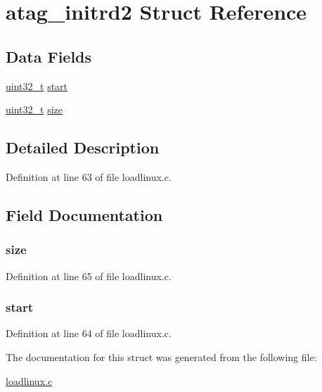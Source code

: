 \hypertarget{structatag__initrd2}{\section{atag\-\_\-initrd2 \-Struct \-Reference}
\label{structatag__initrd2}
}
\subsection*{\-Data \-Fields}
\begin{DoxyCompactItemize}
\item 
\hyperlink{arch__types_8h_a435d1572bf3f880d55459d9805097f62}{uint32\-\_\-t} \hyperlink{structatag__initrd2_a61eb63d26b2fa6c2971603ceccffb14b}{start}
\item 
\hyperlink{arch__types_8h_a435d1572bf3f880d55459d9805097f62}{uint32\-\_\-t} \hyperlink{structatag__initrd2_ab2c6b258f02add8fdf4cfc7c371dd772}{size}
\end{DoxyCompactItemize}


\subsection{\-Detailed \-Description}


\-Definition at line 63 of file loadlinux.\-c.



\subsection{\-Field \-Documentation}
\hypertarget{structatag__initrd2_ab2c6b258f02add8fdf4cfc7c371dd772}{
\subsubsection[{size}]{ {\bf size}}}\label{structatag__initrd2_ab2c6b258f02add8fdf4cfc7c371dd772}


\-Definition at line 65 of file loadlinux.\-c.

\hypertarget{structatag__initrd2_a61eb63d26b2fa6c2971603ceccffb14b}{
\subsubsection[{start}]{ {\bf start}}}\label{structatag__initrd2_a61eb63d26b2fa6c2971603ceccffb14b}


\-Definition at line 64 of file loadlinux.\-c.



\-The documentation for this struct was generated from the following file\-:\begin{DoxyCompactItemize}
\item 
\hyperlink{loadlinux_8c}{loadlinux.\-c}\end{DoxyCompactItemize}
